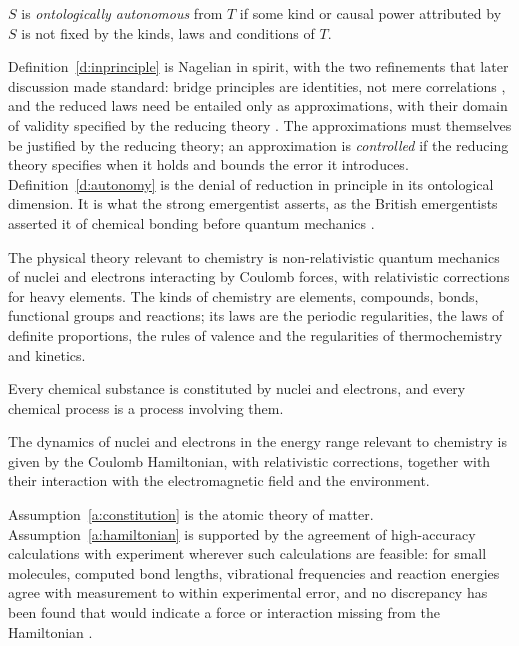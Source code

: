 \documentclass{situationist-preprint}
\begin{document}
\begin{definition}\label{d:autonomy}
$S$ is \emph{ontologically autonomous} from $T$ if some kind or causal power attributed by $S$ is not fixed by the kinds, laws and conditions of $T$.
\end{definition}

Definition~\ref{d:inprinciple} is Nagelian in spirit, with the two refinements that later discussion made standard: bridge principles are identities, not mere correlations \citep{Kim1998}, and the reduced laws need be entailed only as approximations, with their domain of validity specified by the reducing theory \citep{Needham2010}. The approximations must themselves be justified by the reducing theory; an approximation is \emph{controlled} if the reducing theory specifies when it holds and bounds the error it introduces. Definition~\ref{d:autonomy} is the denial of reduction in principle in its ontological dimension. It is what the strong emergentist asserts, as the British emergentists asserted it of chemical bonding before quantum mechanics \citep{Broad1925,McLaughlin1992}.

The physical theory relevant to chemistry is non-relativistic quantum mechanics of nuclei and electrons interacting by Coulomb forces, with relativistic corrections for heavy elements. The kinds of chemistry are elements, compounds, bonds, functional groups and reactions; its laws are the periodic regularities, the laws of definite proportions, the rules of valence and the regularities of thermochemistry and kinetics.

\begin{assumption}\label{a:constitution}
Every chemical substance is constituted by nuclei and electrons, and every chemical process is a process involving them.
\end{assumption}

\begin{assumption}\label{a:hamiltonian}
The dynamics of nuclei and electrons in the energy range relevant to chemistry is given by the Coulomb Hamiltonian, with relativistic corrections, together with their interaction with the electromagnetic field and the environment.
\end{assumption}

Assumption~\ref{a:constitution} is the atomic theory of matter. Assumption~\ref{a:hamiltonian} is supported by the agreement of high-accuracy calculations with experiment wherever such calculations are feasible: for small molecules, computed bond lengths, vibrational frequencies and reaction energies agree with measurement to within experimental error, and no discrepancy has been found that would indicate a force or interaction missing from the Hamiltonian \citep{Kohn1999}.
\end{document}
